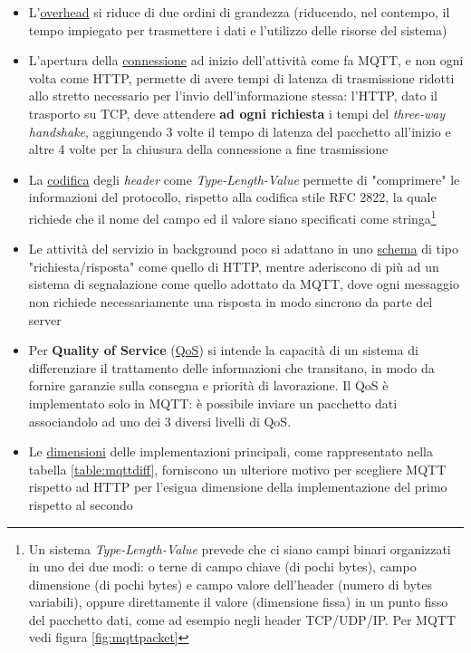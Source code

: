 \documentclass[a4paper,10pt]{memoir}
\begin{document}
\begin{itemize}
\item L'\underline{overhead} si riduce di due ordini di grandezza (riducendo, nel contempo, il tempo impiegato per trasmettere i dati e l'utilizzo delle risorse del sistema)
\item L'apertura della \underline{connessione} ad inizio dell'attività come fa MQTT, e non ogni volta come HTTP, permette di avere tempi di latenza di trasmissione ridotti allo stretto necessario per l'invio dell'informazione stessa: l'HTTP, dato il trasporto su TCP, deve attendere \textbf{ad ogni richiesta} i tempi del \textit{three-way handshake}, aggiungendo 3 volte il tempo di latenza del pacchetto all'inizio e altre 4 volte per la chiusura della connessione a fine trasmissione
\item La \underline{codifica} degli \textit{header} come \textit{Type-Length-Value} permette di "comprimere" le informazioni del protocollo, rispetto alla codifica stile RFC 2822, la quale richiede che il nome del campo ed il valore siano specificati come stringa\footnote{Un sistema \textit{Type-Length-Value} prevede che ci siano campi binari organizzati in uno dei due modi: o terne di campo chiave (di pochi bytes), campo dimensione (di pochi bytes) e campo valore dell'header (numero di bytes variabili), oppure direttamente il valore (dimensione fissa) in un punto fisso del pacchetto dati, come ad esempio negli header TCP/UDP/IP. Per MQTT vedi figura \ref{fig:mqttpacket}}
\item Le attività del servizio in background poco si adattano in uno \underline{schema} di tipo "richiesta/risposta" come quello di HTTP, mentre aderiscono di più ad un sistema di segnalazione come quello adottato da MQTT, dove ogni messaggio non richiede necessariamente una risposta in modo sincrono da parte del server
\item Per \textbf{Quality of Service} (\underline{QoS}) si intende la capacità di un sistema di differenziare il trattamento delle informazioni che transitano, in modo da fornire garanzie sulla consegna e priorità di lavorazione. Il QoS è implementato solo in MQTT: è possibile inviare un pacchetto dati associandolo ad uno dei 3 diversi livelli di QoS.
\item Le \underline{dimensioni} delle implementazioni principali, come rappresentato nella tabella \ref{table:mqttdiff}, forniscono un ulteriore motivo per scegliere MQTT rispetto ad HTTP per l'esigua dimensione della implementazione del primo rispetto al secondo
\end{itemize}
\end{document}
